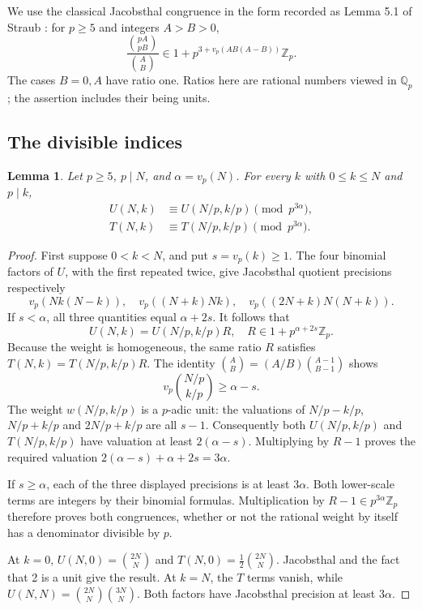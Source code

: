 \documentclass[11pt,a4paper]{article}
\newtheorem{lemma}[theorem]{Lemma}
\newcommand{\vp}{v_p}
\numberwithin{equation}{section}
\begin{document}
We use the classical Jacobsthal congruence in the form recorded as
Lemma 5.1 of Straub \cite{Straub}: for $p\ge5$ and integers $A>B>0$,
\begin{equation}\label{jac}
 \frac{\binom{pA}{pB}}{\binom AB}
 \in 1+p^{3+\vp(AB(A-B))}\mathbb Z_p.
\end{equation}
The cases $B=0,A$ have ratio one. Ratios here are rational numbers
viewed in $\mathbb Q_p$; the assertion includes their being units.

\subsection{The divisible indices}
\begin{lemma}\label{divide}
Let $p\ge5$, $p\mid N$, and $\alpha=\vp(N)$. For every $k$ with
$0\le k\le N$ and $p\mid k$,
\begin{align*}
 U(N,k)&\equiv U(N/p,k/p)\pmod{p^{3\alpha}},\\
 T(N,k)&\equiv T(N/p,k/p)\pmod{p^{3\alpha}}.
\end{align*}
\end{lemma}
\begin{proof}
First suppose $0<k<N$, and put $s=\vp(k)\ge1$.
The four binomial factors of $U$, with the first repeated twice,
give Jacobsthal quotient precisions respectively
\[
 \vp(Nk(N-k)),\quad
 \vp((N+k)Nk),\quad
 \vp((2N+k)N(N+k)).
\]
If $s<\alpha$, all three quantities equal $\alpha+2s$.
It follows that
\[
 U(N,k)=U(N/p,k/p)R,\quad
 R\in1+p^{\alpha+2s}\mathbb Z_p.
\]
Because the weight is homogeneous, the same ratio $R$ satisfies
$T(N,k)=T(N/p,k/p)R$.
The identity $\binom AB=(A/B)\binom{A-1}{B-1}$ shows
\[
 \vp\binom{N/p}{k/p}\ge\alpha-s.
\]
The weight $w(N/p,k/p)$ is a $p$-adic unit: the valuations of
$N/p-k/p$, $N/p+k/p$ and $2N/p+k/p$ are all $s-1$.
Consequently both $U(N/p,k/p)$ and $T(N/p,k/p)$ have valuation
at least $2(\alpha-s)$. Multiplying by $R-1$ proves the required
valuation $2(\alpha-s)+\alpha+2s=3\alpha$.

If $s\ge\alpha$, each of the three displayed precisions is at
least $3\alpha$. Both lower-scale terms are integers by their
binomial formulas. Multiplication by $R-1\in p^{3\alpha}\mathbb Z_p$
therefore proves both congruences, whether or not the rational
weight by itself has a denominator divisible by $p$.

At $k=0$, $U(N,0)=\binom{2N}{N}$ and $T(N,0)=\tfrac12\binom{2N}{N}$.
Jacobsthal and the fact that 2 is a unit give the result.
At $k=N$, the $T$ terms vanish, while
$U(N,N)=\binom{2N}{N}\binom{3N}{N}$.
Both factors have Jacobsthal precision at least $3\alpha$.
\end{proof}
\end{document}
